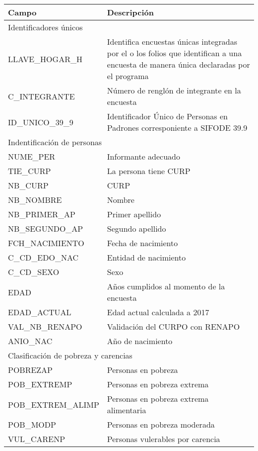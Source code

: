 \begin{longtable}{|p{8cm}|p{8cm}|}
    \hline
    \hline
    Campo  & Descripción\\
    \hline
    \multicolumn{2}{l}{Identificadores únicos}\\
    \hline
    LLAVE\_HOGAR\_H & Identifica encuestas únicas integradas por el o los folios que identifican a una encuesta de manera única declaradas por el programa\\
    \hline
    C\_INTEGRANTE & Número de renglón de integrante en la encuesta\\
    \hline
    ID\_UNICO\_39\_9 & Identificador Único de Personas en Padrones corresponiente a SIFODE 39.9\\
    \hline
    \hline
    \multicolumn{2}{l}{Indentificación de personas}\\
    \hline
    NUME\_PER & Informante adecuado \\
    \hline
    TIE\_CURP & La persona tiene CURP \\
    \hline
    NB\_CURP & CURP \\
    \hline
    NB\_NOMBRE &  Nombre \\
    \hline
    NB\_PRIMER\_AP & Primer apellido \\
    \hline
    NB\_SEGUNDO\_AP & Segundo apellido \\
    \hline
    FCH\_NACIMIENTO & Fecha de nacimiento \\
    \hline
    C\_CD\_EDO\_NAC & Entidad de nacimiento \\
    \hline
    C\_CD\_SEXO & Sexo \\
    \hline
    EDAD & Años cumplidos al momento de la encuesta \\
    \hline
    EDAD\_ACTUAL & Edad actual calculada a 2017 \\
    \hline
    VAL\_NB\_RENAPO & Validación del CURPO con RENAPO \\
    \hline
    ANIO\_NAC & Año de nacimiento \\
    \hline
    \hline
    \multicolumn{2}{l}{Clasificación de pobreza y carencias}\\
    \hline
    POBREZAP & Personas en pobreza \\
    \hline
    POB\_EXTREMP & Personas en pobreza extrema \\
    \hline
    POB\_EXTREM\_ALIMP & Personas en pobreza extrema alimentaria \\
    \hline
    POB\_MODP & Personas en pobreza moderada \\
    \hline
    VUL\_CARENP & Personas vulerables por carencia \\

\end{longtable}
